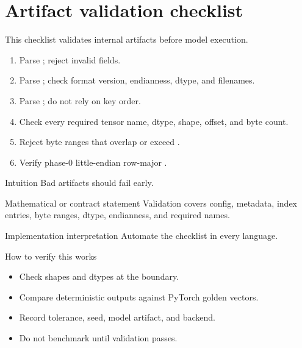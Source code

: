 \chapter{Artifact validation checklist}
\label{app:artifact-check}
This checklist validates internal artifacts before model execution.


\begin{enumerate}[label=\textbf{G.\arabic*.}]
\item Parse ; reject invalid fields.
\item Parse ; check format version, endianness, dtype, and filenames.
\item Parse ; do not rely on key order.
\item Check every required tensor name, dtype, shape, offset, and byte count.
\item Reject byte ranges that overlap or exceed .
\item Verify phase-0 little-endian row-major .
\end{enumerate}


\begin{intuitionbox}{Intuition}
Bad artifacts should fail early.
\end{intuitionbox}

\begin{definitionbox}{Mathematical or contract statement}
Validation covers config, metadata, index entries, byte ranges, dtype, endianness, and required names.
\end{definitionbox}

\begin{implementationbox}{Implementation interpretation}
Automate the checklist in every language.
\end{implementationbox}

\begin{verificationbox}{How to verify this works}
\begin{itemize}
\item Check shapes and dtypes at the boundary.
\item Compare deterministic outputs against PyTorch golden vectors.
\item Record tolerance, seed, model artifact, and backend.
\item Do not benchmark until validation passes.
\end{itemize}
\end{verificationbox}

